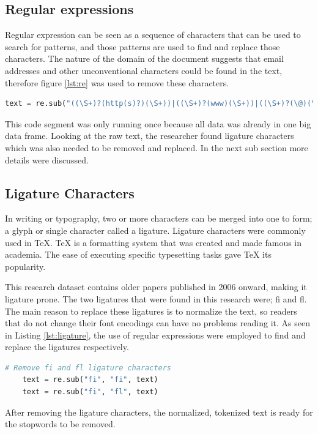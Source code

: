 \subsection{Regular expressions}
Regular expression can be seen as a sequence of characters that can be used to search for patterns, and those patterns are used to find and replace those characters. The nature of the domain of the document suggests that email addresses and other unconventional characters could be found in the text, therefore figure \ref{lst:re} was used to remove these characters.
\begin{lstlisting}[language=Python, label={lst:re}, caption=Regular Expression]
text = re.sub("((\S+)?(http(s)?)(\S+))|((\S+)?(www)(\S+))|((\S+)?(\@)(\S+)?)", " ", text)
\end{lstlisting}
This code segment was only running once because all data was already in one big data frame. Looking at the raw text, the researcher found ligature characters which was also needed to be removed and replaced. In the next sub section more details were discussed.

\subsection{Ligature Characters} \label{ssec:ligature}

In writing or typography, two or more characters can be merged into one to form; a glyph or single character called a ligature. Ligature characters were commonly used in \TeX{}. \TeX{} is a formatting system that was created and made famous in academia. The ease of executing specific typesetting tasks gave \TeX{} its popularity. 

This research dataset contains older papers published in 2006 onward, making it ligature prone. The two ligatures that were found in this research were; fi and fl. The main reason to replace these ligatures is to normalize the text, so readers that do not change their font encodings can have no problems reading it.
As seen in Listing \ref{lst:ligature}, the use of regular expressions were employed to find and replace the ligatures respectively.
\begin{lstlisting}[language=Python, label={lst:ligature}, caption=Replacing Ligature Characters]
    # Remove fi and fl ligature characters
    text = re.sub("fi", "fi", text)
    text = re.sub("fi", "fl", text)
\end{lstlisting}
After removing the ligature characters, the normalized, tokenized text is ready for the stopwords to be removed.

